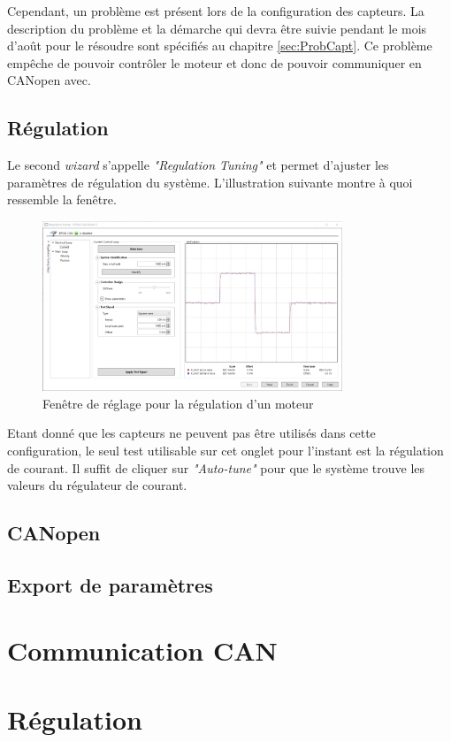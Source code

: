 Cependant, un problème est présent lors de la configuration des capteurs. La description du problème et la démarche qui devra être suivie pendant
le mois d'août pour le résoudre sont spécifiés au chapitre \ref{sec:ProbCapt}. Ce problème empêche de pouvoir contrôler le moteur et donc de
pouvoir communiquer en CANopen avec.\\

\subsection{Régulation}
Le second \textit{wizard} s'appelle \textit{"Regulation Tuning"} et permet d'ajuster les paramètres de régulation du système. L'illustration
suivante montre à quoi ressemble la fenêtre.

\begin{figure}[H]
    \centering
    \includegraphics[width = 0.8\textwidth]{assets/figures/RegulationTuning.png}
    \caption{Fenêtre de réglage pour la régulation d'un moteur}
    \label{fig:RegTune}
\end{figure}

Etant donné que les capteurs ne peuvent pas être utilisés dans cette configuration, le seul test utilisable sur cet onglet pour l'instant
est la régulation de courant. Il suffit de cliquer sur \textit{"Auto-tune"} pour que le système trouve les valeurs du régulateur de courant.\\

\subsection{CANopen}

\subsection{Export de paramètres}

\section{Communication CAN}

\section{Régulation}

